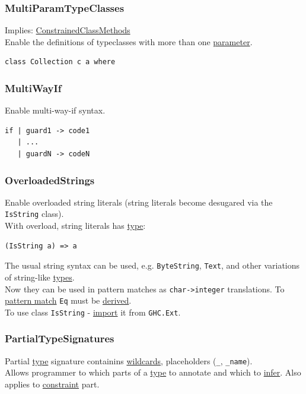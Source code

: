 \documentclass[a4paper,14pt,oneside]{book}
\begin{document}
\subsubsection{\label{orgf755ed3}MultiParamTypeClasses}
\label{sec:org6a35f42}
Implies: \hyperref[orgcac40c4]{ConstrainedClassMethods}\\
Enable the definitions of typeclasses with more than one \hyperref[org016fda3]{parameter}.\\
\begin{verbatim}
class Collection c a where
\end{verbatim}

\subsubsection{\label{org0b1bec3}MultiWayIf}
\label{sec:org8143b41}
Enable multi-way-if syntax.\\
\begin{verbatim}
if | guard1 -> code1
   | ...
   | guardN -> codeN
\end{verbatim}

\subsubsection{\label{org7beb55a}OverloadedStrings}
\label{sec:orgf9728d4}
Enable overloaded string literals (string literals become desugared via the \texttt{IsString} class).\\

With overload, string literals has \hyperref[orga286a54]{type}:\\
\begin{verbatim}
(IsString a) => a
\end{verbatim}

The usual string syntax can be used, e.g. \texttt{ByteString}, \texttt{Text}, and other variations of string-like \hyperref[orga478d03]{types}.\\
Now they can be used in pattern matches as \texttt{char->integer} translations. To \hyperref[orgef9dab6]{pattern match} \texttt{Eq} must be \hyperref[org574f51c]{derived}.\\

To use class \texttt{IsString} - \hyperref[orgb9c1e7a]{import} it from \texttt{GHC.Ext}.\\

\subsubsection{\label{orgfdbd034}PartialTypeSignatures}
\label{sec:org21ec251}
Partial \hyperref[orga286a54]{type} signature containins \hyperref[orgffad5bc]{wildcards}, placeholders (\texttt{\_}, \texttt{\_name}).\\
Allows programmer to which parts of a \hyperref[orga286a54]{type} to annotate and which to \hyperref[orgfff0cf0]{infer}. Also applies to \hyperref[org657d4e5]{constraint} part.\\
\end{document}
